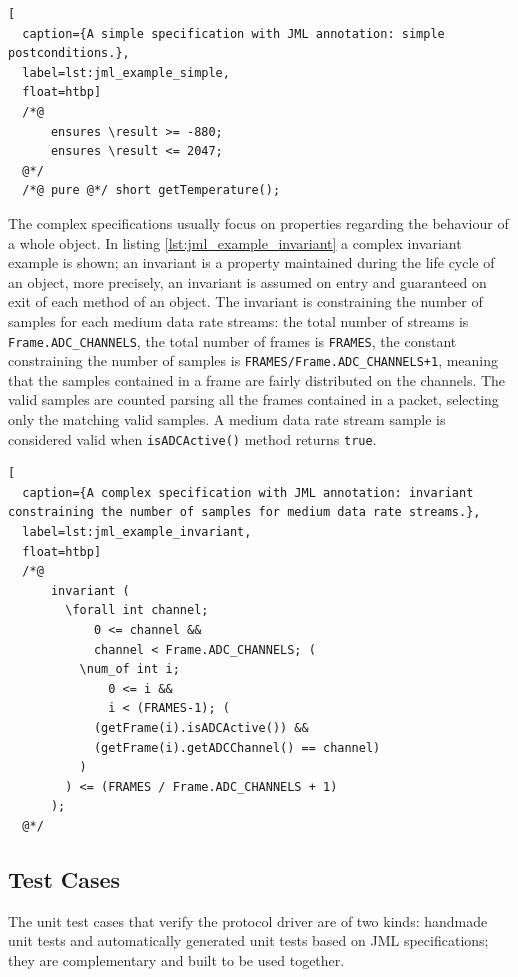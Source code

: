 \documentclass[english]{lni}
\newcommand{\lil}[1]{\texttt{\lstinline|#1|}}
\begin{document}
\begin{lstlisting}[
  caption={A simple specification with JML annotation: simple postconditions.},
  label=lst:jml_example_simple,
  float=htbp]
  /*@ 
      ensures \result >= -880; 
      ensures \result <= 2047; 
  @*/ 
  /*@ pure @*/ short getTemperature();
\end{lstlisting}

\sloppy

The complex specifications usually focus on properties regarding the behaviour of a whole object.
In listing \ref{lst:jml_example_invariant} a complex invariant example is shown; an invariant is a property maintained during the life cycle of an object, more precisely, an invariant is assumed on entry and guaranteed on exit of each method of an object. 
The invariant is constraining the number of samples for each medium data rate streams: the total number of streams is \lil{Frame.ADC_CHANNELS}, the total number of frames is \lil{FRAMES}, the constant constraining the number of samples is \lil{FRAMES/Frame.ADC_CHANNELS+1}, meaning that the samples contained in a frame are fairly distributed on the channels.
The valid samples are counted parsing all the frames contained in a packet, selecting only the matching valid samples.  
A medium data rate stream sample is considered valid when \lil{isADCActive()} method returns \lil{true}.

\fussy

\begin{lstlisting}[
  caption={A complex specification with JML annotation: invariant constraining the number of samples for medium data rate streams.},
  label=lst:jml_example_invariant,
  float=htbp]
  /*@ 
      invariant ( 
        \forall int channel; 
            0 <= channel && 
            channel < Frame.ADC_CHANNELS; ( 
          \num_of int i; 
              0 <= i && 
              i < (FRAMES-1); (
            (getFrame(i).isADCActive()) && 
            (getFrame(i).getADCChannel() == channel)
          ) 
        ) <= (FRAMES / Frame.ADC_CHANNELS + 1) 
      ); 
  @*/
\end{lstlisting}



\subsection{Test Cases}
\label{subsec:test_cases}

The unit test cases that verify the protocol driver are of two kinds: handmade unit tests and automatically generated unit tests based on JML specifications; they are complementary and built to be used together.  
\end{document}
